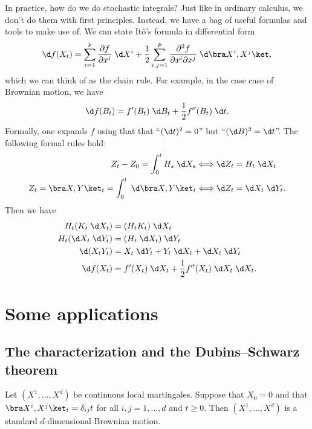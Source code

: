 \documentclass[a4paper]{article}
\begin{document}
In practice, how do we do stochastic integrals? Just like in ordinary calculus, we don't do them with first principles. Instead, we have a bag of useful formulas and tools to make use of. We can state It\^o's formula in differential form
\[
  \d f(X_t) = \sum_{i = 1}^p \frac{\partial f}{\partial x^i} \;\d X^i + \frac{1}{2} \sum_{i, j = 1}^p \frac{\partial^2 f}{\partial x^i\partial x^j} \;\d \bra X^i, X^j\ket,
\]
which we can think of as the chain rule. For example, in the case case of Brownian motion, we have
\[
  \d f(B_t) = f'(B_t) \;\d B_t + \frac{1}{2} f''(B_t) \;\d t.
\]
Formally, one expands $f$ using that that ``$(\d t)^2 = 0$'' but ``$(\d B)^2 = \d t$''. The following formal rules hold:
\begin{align*}
  Z_t - Z_0 = \int_0^t H_s \;\d X_s &\Longleftrightarrow \d Z_t = H_t \;\d X_t\\
  Z_t = \bra X, Y\ket_t = \int_0^t \;\d \bra X, Y\ket_t &\Longleftrightarrow \d Z_t = \d X_t \;\d Y_t.
\end{align*}
Then we have
\begin{align*}
  H_t(K_t \;\d X_t) &= (H_t K_t)\;\d X_t\\
  H_t (\d X_t \;\d Y_t) &= (H_t \;\d X_t)\;\d Y_t\\
  \d (X_t Y_t) &= X_t \;\d Y_t + Y_t \;\d X_t + \d X_t \;\d Y_t\\
  \d f(X_t) &= f'(X_t) \;\d X_t + \frac{1}{2} f''(X_t) \;\d X_t\;\d X_t.
\end{align*}

\section{Some applications}
\subsection{The  characterization and the Dubins--Schwarz theorem} %
\begin{thm}
  Let $(X^1, \ldots, X^d)$ be continuous local martingales. Suppose that $X_0 = 0$ and that $\bra X^i, X^j\ket_t = \delta_{ij} t$ for all $i, j = 1, \ldots, d$ and $t \geq 0$. Then $(X^1, \ldots, X^d)$ is a standard $d$-dimensional Brownian motion.
\end{thm}
\end{document}
